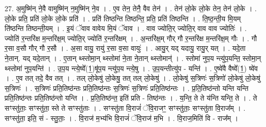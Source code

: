 \documentclass[17pt]{extarticle}
\begin{document}
27. अ॒मुष्मि॑न् ने॒वै वामुष्मि॑न् न॒मुष्मि॑न् ने॒व । . ए॒व तेन॒ तेनै॒ वैव तेन॑ । . तेन॑ लो॒के लो॒के तेन॒ तेन॑ लो॒के । . लो॒के प्रति॒ प्रति॑ लो॒के लो॒के प्रति॑ । . प्रति॑ तिष्ठन्ति तिष्ठन्ति॒ प्रति॒ प्रति॑ तिष्ठन्ति । . ति॒ष्ठ॒न्ती॒य मि॒यम् ति॑ष्ठन्ति तिष्ठन्ती॒यम् । . इ॒यं ॅवाव वावेय मि॒यं ॅवाव । . वाव ज्योति॒र् ज्योति॒र् वाव वाव ज्योतिः॑ । . ज्योति॑ र॒न्तरि॑क्ष म॒न्तरि॑क्ष॒म् ज्योति॒र् ज्योति॑ र॒न्तरि॑क्षम् । . अ॒न्तरि॑क्ष॒म् गौर् गौ र॒न्तरि॑क्ष म॒न्तरि॑क्ष॒म् गौः । . गौ र॒सा व॒सौ गौर् गौ र॒सौ । . अ॒सा वायु॒ रायु॑ र॒सा व॒सा वायुः॑ । . आयु॒र् यद् यदायु॒ रायु॒र् यत् । . यदे॒ता ने॒तान्. यद् यदे॒तान् । . ए॒तान् थ्स्तोमा॒न् थ्स्तोमा॑ ने॒ता ने॒तान् थ्स्तोमान्॑ । . स्तोमा॑ नुप॒य न्त्यु॑प॒यन्ति॒ स्तोमा॒न् थ्स्तोमा॑ नुप॒यन्ति॑ । . उ॒प॒य न्त्ये॒ष्वे᳚(1॒)षू॑प॒य न्त्यु॑प॒य न्त्ये॒षु । . उ॒प॒यन्तीत्यु॑प - यन्ति॑ । . ए॒ष्वे॑वै वैष्वे᳚(1॒) ष्वे॑व । . ए॒व तत् तदे॒ वैव तत् । . तल् लो॒केषु॑ लो॒केषु॒ तत् तल् लो॒केषु॑ । . लो॒केषु॑ स॒त्रिणः॑ स॒त्रिणो॑ लो॒केषु॑ लो॒केषु॑ स॒त्रिणः॑ । . स॒त्रिणः॑ प्रति॒तिष्ठ॑न्तः प्रति॒तिष्ठ॑न्तः स॒त्रिणः॑ स॒त्रिणः॑ प्रति॒तिष्ठ॑न्तः । . प्र॒ति॒तिष्ठ॑न्तो यन्ति यन्ति प्रति॒तिष्ठ॑न्तः प्रति॒तिष्ठ॑न्तो यन्ति । . प्र॒ति॒तिष्ठ॑न्त॒ इति॑ प्रति - तिष्ठ॑न्तः । . य॒न्ति॒ ते ते य॑न्ति यन्ति॒ ते । . ते सꣳस्तु॑ताः॒ सꣳस्तु॑ता॒ स्ते ते सꣳस्तु॑ताः । . सꣳस्तु॑ता वि॒राजं॑ ॅवि॒राजꣳ॒॒ सꣳस्तु॑ताः॒ सꣳस्तु॑ता वि॒राज᳚म् । . सꣳस्तु॑ता॒ इति॒ सं - स्तु॒ताः॒ । . वि॒राज॑ म॒भ्य॑भि वि॒राजं॑ ॅवि॒राज॑ म॒भि । . वि॒राज॒मिति॑ वि - राज᳚म् । \newline
\end{document}
